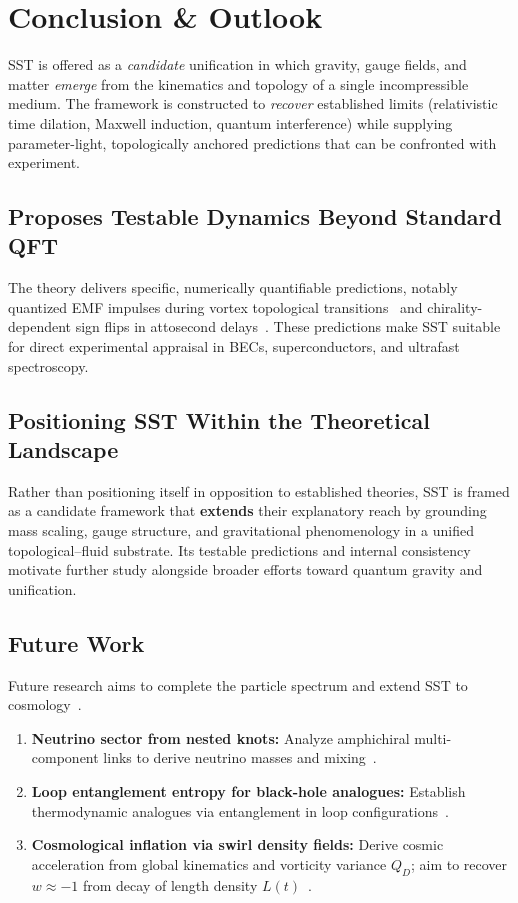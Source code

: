 \documentclass[10pt,reprint,aps,onecolumn,nofootinbib]{revtex4-2}
\begin{document}
\section{Conclusion \& Outlook}
\label{sec:conclusion}
SST is offered as a \emph{candidate} unification in which gravity, gauge fields, and matter \emph{emerge} from the kinematics and topology of a single incompressible medium. The framework is constructed to \emph{recover} established limits (relativistic time dilation, Maxwell induction, quantum interference) while supplying parameter-light, topologically anchored predictions that can be confronted with experiment.

\subsection*{Proposes Testable Dynamics Beyond Standard QFT}
    The theory delivers specific, numerically quantifiable predictions, notably quantized EMF impulses during vortex topological transitions~\cite{2} and chirality-dependent sign flips in attosecond delays~\cite{6}. These predictions make SST suitable for direct experimental appraisal in BECs, superconductors, and ultrafast spectroscopy.

\subsection*{Positioning SST Within the Theoretical Landscape}
    Rather than positioning itself in opposition to established theories, SST is framed as a candidate framework that \textbf{extends} their explanatory reach by grounding mass scaling, gauge structure, and gravitational phenomenology in a unified topological–fluid substrate. Its testable predictions and internal consistency motivate further study alongside broader efforts toward quantum gravity and unification.

\subsection*{Future Work}
    Future research aims to complete the particle spectrum and extend SST to cosmology~\cite{1}.
    \begin{enumerate}
    \item \textbf{Neutrino sector from nested knots:} Analyze amphichiral multi-component links to derive neutrino masses and mixing~\cite{4}.
    \item \textbf{Loop entanglement entropy for black-hole analogues:} Establish thermodynamic analogues via entanglement in loop configurations~\cite{1}.
    \item \textbf{Cosmological inflation via swirl density fields:} Derive cosmic acceleration from global kinematics and vorticity variance $Q_D$; aim to recover $w \approx -1$ from decay of length density $L(t)$~\cite{1}.
    \end{enumerate}
\end{document}
